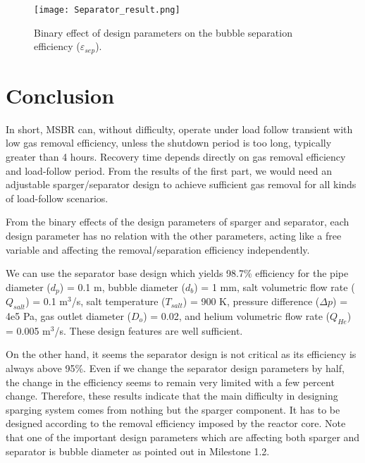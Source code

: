 \begin{figure}[htbp!]
    \begin{center}
        \texttt{[image: Separator\_result.png]}
    \end{center}
    \caption{Binary effect of design parameters on the bubble separation
    efficiency ($\varepsilon$$_{sep}$).}
    \label{fig:binary_eff_separator}
\end{figure}

\newpage
\FloatBarrier

\section{Conclusion}

    In short, MSBR can, without difficulty, operate under load follow transient 
    with low gas removal efficiency, unless the shutdown period is too long, 
    typically greater than 4 hours. Recovery time depends directly on gas 
    removal efficiency and load-follow period. From the results of the first 
    part, we would need an adjustable sparger/separator design to achieve 
    sufficient gas removal for all kinds of load-follow scenarios.

    From the binary effects of the design parameters of sparger and separator, 
    each design parameter has no relation with the other parameters, acting 
    like a free variable and affecting the removal/separation efficiency 
    independently.

    We can use the separator base design which yields 98.7\% efficiency for the 
    pipe diameter ($d_p$) = 0.1 m, bubble diameter ($d_b$) = 1 mm, salt 
    volumetric flow rate ($Q_{salt}$) = 0.1 m$^{3}$/s, salt temperature 
    ($T_{salt}$) = 900 K, pressure difference ($\Delta p$) = 4e5 Pa, gas outlet 
    diameter ($D_o$) = 0.02, and helium volumetric flow rate ($Q_{He}$) = 0.005 
    m$^{3}$/s. These design features are well sufficient.

    On the other hand, it seems the separator design is not critical as its 
    efficiency is always above 95\%. Even if we change the separator design 
    parameters by half, the change in the efficiency seems to remain very 
    limited with a few percent change. Therefore, these results indicate that 
    the main difficulty in designing sparging system comes from nothing but the 
    sparger component. It has to be designed according to the removal 
    efficiency imposed by the reactor core. Note that one of the important 
    design parameters which are affecting both sparger and separator is bubble 
    diameter as pointed out in Milestone 1.2.

